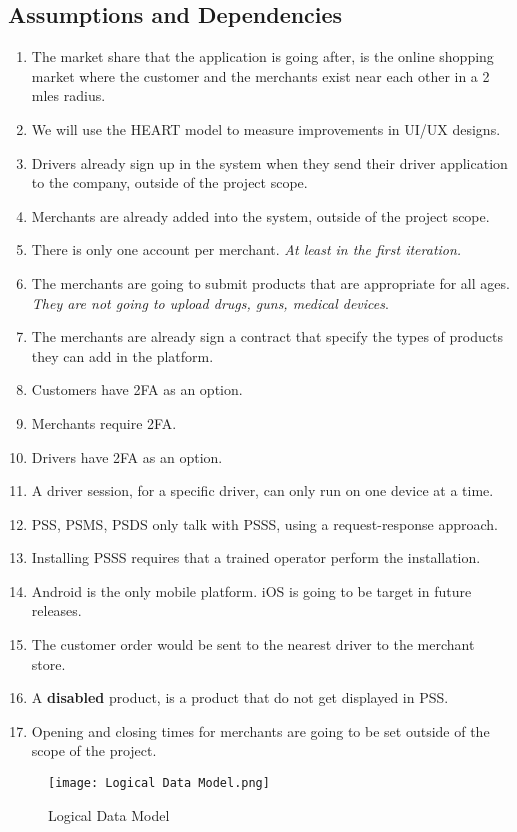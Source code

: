 \subsection{Assumptions and Dependencies}
\begin{enumerate}[label=AS-\arabic*]
    \item The market share that the application is going after, is the online 
    shopping market where the customer and the merchants exist near each other
    in a 2 mles radius.
    \item We will use the HEART model \cite{heart} to measure improvements 
    in UI/UX designs.
    \item Drivers already sign up in the system when they send their 
    driver application to the company, outside of the project scope.
    \item Merchants are already added into the system, outside of the 
    project scope.
    \item There is only one account per merchant. \textit{At least in the first 
    iteration.}
    \item The merchants are going to submit products that are appropriate for 
    all ages. \textit{They are not going to upload drugs, guns, medical 
    devices}.
    \item The merchants are already sign a contract that specify the types of 
    products they can add in the platform.
    \item Customers have 2FA \cite{2fa} as an option.
    \item Merchants require 2FA.
    \item Drivers have 2FA as an option.
    \item A driver session, for a specific driver, can only run on one 
    device at a time.
    \item PSS, PSMS, PSDS only talk with PSSS, using a request-response 
    approach.
    \item Installing PSSS requires that a trained operator perform 
    the installation.
    \item Android is the only mobile platform. iOS is going to be target in 
    future releases.
    \item The customer order would be sent to the nearest driver to the 
    merchant store.
    \item A \textbf{disabled} product, is a product that do not get displayed 
    in PSS.
    \item Opening and closing times for merchants are going to be set outside 
    of the scope of the project.
\end{enumerate}
\begin{figure}[!htb]
    \centering
    \texttt{[image: Logical Data Model.png]}
    \caption{Logical Data Model}
    \label{fig:data-model}
\end{figure}

